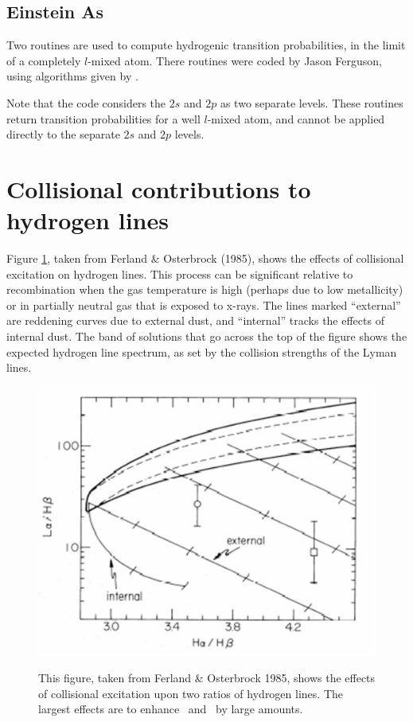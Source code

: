 \subsection{Einstein As}

Two routines are used to compute hydrogenic transition probabilities, in
the limit of a completely $l$-mixed atom.  There routines were coded by Jason
Ferguson, using algorithms given by \citet{Johnson1972}.

Note that the code considers the $2s$ and $2p$ as two separate levels.  These
routines return transition probabilities for a well $l$-mixed atom, and cannot
be applied directly to the separate $2s$ and $2p$ levels.

\section{Collisional contributions to hydrogen lines}

Figure \ref{fig:HLinesFerlandOsterbrock},
taken from Ferland \& Osterbrock (1985), shows the effects of
collisional excitation on hydrogen lines.  This process can be significant
relative to recombination when the gas temperature is high (perhaps due
to low metallicity) or in partially neutral gas that is exposed to x-rays.
The lines marked ``external'' are reddening curves due to external dust,
and ``internal'' tracks the effects of internal dust.  The band of solutions
that go across the top of the figure shows the expected hydrogen line
spectrum, as set by the collision strengths of the Lyman lines.

\begin{figure}
\centering
\includegraphics[scale=0.4]{HLinesFerlandOsterbrock}
\label{fig:HLinesFerlandOsterbrock}
\caption[Hydrogen line ratios]
{This figure, taken from Ferland \& Osterbrock 1985, shows the
effects of collisional excitation upon two ratios of hydrogen lines.  The
largest effects are to enhance \la\ and \ha\ by large amounts. }
\end{figure}

